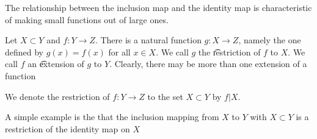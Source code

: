 

The relationship between the inclusion map and the identity map is characteristic of making small functions out of large ones.


Let $X \subset Y$ and $f: Y \to Z$.
There is a natural function $g: X \to Z$, namely the one defined by $g(x) = f(x)$ for all $x \in X$.
We call $g$ the \t{restriction} of $f$ to $X$.
We call $f$ an \t{extension} of $g$ to $Y$.
Clearly, there may be more than one extension of a function


We denote the restriction of $f: Y \to Z$ to the set $X \subset Y$ by $f|X$.


A simple example is the that the inclusion mapping from $X$ to $Y$ with $X \subset Y$ is a restriction of the identity map on $X$

\blankpage
